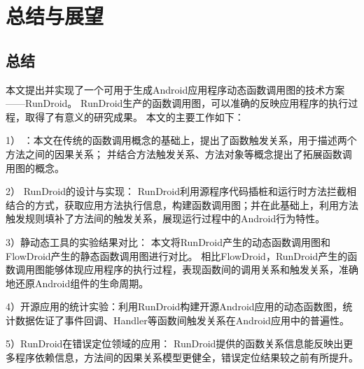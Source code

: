 \chapter{总结与展望}
\label{chp:future}
\section{总结}


本文提出并实现了一个可用于生成Android应用程序动态函数调用图的技术方案——RunDroid。
RunDroid生产的函数调用图，可以准确的反映应用程序的执行过程，取得了有意义的研究成果。
本文的主要工作如下：


1） \ecg：本文在传统的函数调用概念的基础上，提出了函数触发关系，用于描述两个方法之间的因果关系；
并结合方法触发关系、方法对象等概念提出了拓展函数调用图的概念。

2） RunDroid的设计与实现：
RunDroid利用源程序代码插桩和运行时方法拦截相结合的方式，获取应用方法执行信息，构建函数调用图；并在此基础上，利用方法触发规则填补了方法间的触发关系，展现运行过程中的Android行为特性。


3）静动态工具的实验结果对比：
本文将RunDroid产生的动态函数调用图和FlowDroid产生的静态函数调用图进行对比。
相比FlowDroid，RunDroid产生的函数调用图能够体现应用程序的执行过程，表现函数间的调用关系和触发关系，准确地还原Android组件的生命周期。

4）开源应用的统计实验：利用RunDroid构建开源Android应用的动态函数图，统计数据佐证了事件回调、Handler等函数间触发关系在Android应用中的普遍性。



5）RunDroid在错误定位领域的应用：
RunDroid提供的函数关系信息能反映出更多程序依赖信息，方法间的因果关系模型更健全，错误定位结果较之前有所提升。









